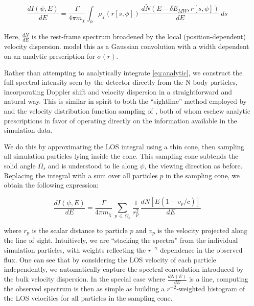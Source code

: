 \documentclass[aps,prl,10pt,twocolumn,superscriptaddress,showpacs]{revtex4-1}
\begin{document}
\begin{equation} \label{eq:analytic}
\frac{dI(\psi, E)}{dE} = \frac{\Gamma}{4 \pi m_\chi} \int_\phi \rho_\chi(r[s,\phi]) \,
\frac{d\widetilde{N}(E-\delta E_{MW}, r[s,\phi])}{dE} \, ds
\end{equation}

Here, $\frac{d\widetilde{N}}{dE}$ is the rest-frame spectrum broadened by the local
(position-dependent) velocity dispersion. \cite{speckhard2016} model this as a Gaussian convolution
with a width dependent on an analytic prescription for $\sigma(r)$.

Rather than attempting to analytically integrate \eqref{eq:analytic}, we construct the full
spectral intensity seen by the detector directly from the N-body particles, incorporating Doppler shift
and velocity dispersion in a straightforward and natural way.   This is similar in spirit to both the ``sightline'' method employed by 
\cite{lovell2015} and the velocity distribution function sampling of \cite{mao2013}, both of whom
eschew analytic prescriptions in favor of operating directly on the information available in the
simulation data. 

We do this by approximating the LOS integral using a thin cone, then sampling all simulation
particles lying inside the cone.  This sampling cone subtends the solid angle $\Omega_s$ and is
understood to lie along $\psi$, the viewing direction as before.  Replacing the integral with a sum over all particles
$p$ in the sampling cone, we obtain the following expression:

\begin{equation} \label{eq:discrete}
	\frac{dI(\psi, E)}{dE} = \frac{\Gamma}{4 \pi m_\chi}\, \sum_{p \, \in \, \Omega_s}
	\, \frac{1}{r_p^{2}} \, \frac{dN[E(1-v_p/c)]}{dE}
\end{equation}

where $r_p$ is the scalar distance to particle $p$ and $v_p$ is the velocity projected along the
line of sight. Intuitively, we are ``stacking the spectra'' from the individual simulation
particles, with weights reflecting the $r^{-2}$ dependence in the observed flux. One can see that by
considering the LOS velocity of each particle independently, we automatically capture the spectral
convolution introduced by the bulk velocity dispersion. In the special case where
$\frac{dN(E)}{dE}$ is a line, computing the observed spectrum is then as simple as
building a $r^{-2}$-weighted histogram of the LOS velocities for all particles in the sampling cone.
\end{document}
